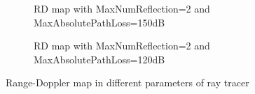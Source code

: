 \documentclass[12pt,DIV14,BCOR12mm,a4paper,footinclude=false,headinclude,parskip=half-,twoside,openright,cleardoublepage=empty,toc=index,bibliography=totoc,listof=totoc]{scrreprt}
\numberwithin{equation}{chapter}
\begin{document}
\begin{figure}[t]
\begin{subfigure}{0.45\textwidth}
        \label{rd map with maxnumreflection=4 and maxabsolutepathloss=120dB}
    \end{subfigure}
    \begin{subfigure}{0.45\textwidth}
        \centering
        \caption{RD map with MaxNumReflection=2 and MaxAbsolutePathLoss=150dB}
        \label{rd map with maxnumreflection=2 and maxabsolutepathloss=150dB}
    \end{subfigure}\hspace{0.5cm}
    \begin{subfigure}{0.45\textwidth}
        \centering
        \caption{RD map with MaxNumReflection=2 and MaxAbsolutePathLoss=120dB}
        \label{rd map with maxnumreflection=2 and maxabsolutepathloss=120dB}
    \end{subfigure}
    \caption{Range-Doppler map in different parameters of ray tracer}
    \label{range doppler map in different parameters of ray tracer}
\end{figure}
\end{document}
